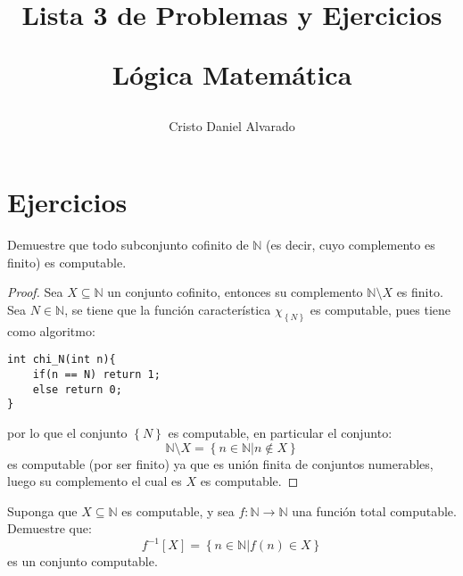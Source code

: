 \documentclass[12pt]{report}
\newcounter{it}
\theoremstyle{largebreak}
\newcommand\cf[3]{\ensuremath{#1:#2\rightarrow#3}}
\begin{document}
    \setlength{\parskip}{5pt} %
    \setlength{\parindent}{12pt} %
    \title{Lista 3 de Problemas y Ejercicios
    
    Lógica Matemática}
    \author{Cristo Daniel Alvarado}
    \maketitle


    \newpage

    \setcounter{chapter}{3}

    \section{Ejercicios}
   
    \begin{excer}
        Demuestre que todo subconjunto cofinito de $\mathbb{N}$ (es decir, cuyo complemento es finito) es computable.
    \end{excer}

    \begin{proof}
        Sea $X\subseteq\mathbb{N}$ un conjunto cofinito, entonces su complemento $\mathbb{N}\setminus X$ es finito. Sea $N\in\mathbb{N}$, se tiene que la función característica $\chi_{\left\{N \right\}}$ es computable, pues tiene como algoritmo:
        \begin{lstlisting}
int chi_N(int n){
    if(n == N) return 1;
    else return 0;
}
        \end{lstlisting}
        por lo que el conjunto $\left\{N \right\}$ es computable, en particular el conjunto:
        \begin{equation*}
            \mathbb{N}\setminus X=\left\{n\in\mathbb{N}\Big|n\notin X \right\}
        \end{equation*}
        es computable (por ser finito) ya que es unión finita de conjuntos numerables, luego su complemento el cual es $X$ es computable.
    \end{proof}

    \begin{excer}
        Suponga que $X\subseteq\mathbb{N}$ es computable, y sea $\cf{f}{\mathbb{N}}{\mathbb{N}}$ una función total computable. Demuestre que:
        \begin{equation*}
            f^{-1}[X]=\left\{n\in\mathbb{N}\Big|f(n)\in X \right\}
        \end{equation*}
        es un conjunto computable.
    \end{excer}
\end{document}
